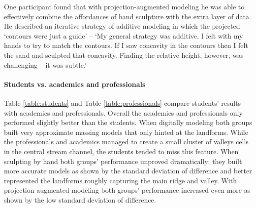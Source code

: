 \documentclass[prodmode,acmtochi]{acmsmall} %
\begin{document}
One participant found that 
with projection-augmented modeling 
he was able to effectively combine 
the affordances of hand sculpture 
with the extra layer of data. 
%
He described an iterative strategy of additive modeling
in which the projected `contours were just a guide' --  
`My general strategy was additive. 
I felt with my hands to try to match the contours. 
If I saw concavity in the contours 
then I felt the sand and sculpted that concavity.
Finding the relative height, however, was challenging -- 
it was subtle.'

\paragraph{Students vs. academics and professionals}
%
Table \ref{table:students} and Table \ref{table:professionals}
compare students' results 
with academics and professionals. 
Overall the academics and professionals
only performed slightly better than the students.
When digitally modeling both groups 
built very approximate massing models
that only hinted at the landforms. 
While the professionals and academics 
managed to create a small cluster of valleys cells
in the central stream channel, 
the students tended to miss this feature. 
When sculpting by hand
both groups' performance improved dramatically;
they built more accurate models
as shown by the standard deviation of difference
and better represented the landforms
roughly capturing the main ridge and valley. 
%
With projection augmented modeling
both groups' performance increased even more
as shown by the low standard deviation of difference.
\end{document}
